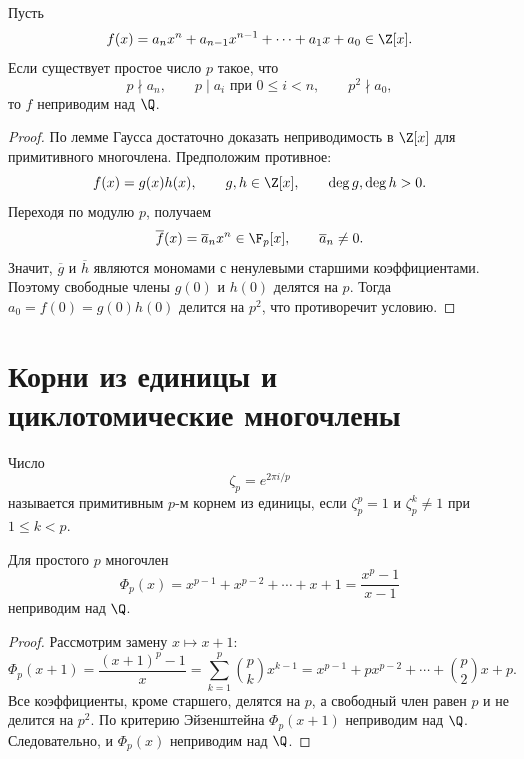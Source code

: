 \begin{stmt}
    Пусть
    \[
        f(x)=a_nx^n+a_{n-1}x^{n-1}+\cdots+a_1x+a_0 \in \Z[x].
    \]
    Если существует простое число $p$ такое, что
    \[
        p \nmid a_n, \qquad p\mid a_i \text{ при } 0\le i<n, \qquad p^2\nmid a_0,
    \]
    то $f$ неприводим над $\Q$.

    \begin{proof}
        По лемме Гаусса достаточно доказать неприводимость в $\Z[x]$ для примитивного многочлена. Предположим противное:
        \[
            f(x)=g(x)h(x), \qquad g,h\in \Z[x], \qquad \deg g,\deg h>0.
        \]
        Переходя по модулю $p$, получаем
        \[
            \overline f(x)=\overline a_n x^n \in \F_p[x], \qquad \overline a_n\neq0.
        \]
        Значит, $\overline g$ и $\overline h$ являются мономами с ненулевыми старшими коэффициентами.
        Поэтому свободные члены $g(0)$ и $h(0)$ делятся на $p$. Тогда $a_0=f(0)=g(0)h(0)$ делится на
        $p^2$, что противоречит условию.
    \end{proof}
\end{stmt}

\section{Корни из единицы и циклотомические многочлены}

\begin{definition}
    Число
    \[
        \zeta_p = e^{2\pi i/p}
    \]
    называется примитивным $p$-м корнем из единицы, если $\zeta_p^p=1$ и $\zeta_p^k\neq1$ при $1\le k<p$.
\end{definition}

\begin{stmt}
    Для простого $p$ многочлен
    \[
        \Phi_p(x)=x^{p-1}+x^{p-2}+\cdots+x+1=\frac{x^p-1}{x-1}
    \]
    неприводим над $\Q$.

    \begin{proof}
        Рассмотрим замену $x\mapsto x+1$:
        \[
            \Phi_p(x+1)=\frac{(x+1)^p-1}{x}
            = \sum_{k=1}^{p}\binom pk x^{k-1}
            = x^{p-1}+p x^{p-2}+\cdots+\binom p2x+p.
        \]
        Все коэффициенты, кроме старшего, делятся на $p$, а свободный член равен $p$ и не делится на
        $p^2$. По критерию Эйзенштейна $\Phi_p(x+1)$ неприводим над $\Q$. Следовательно, и $\Phi_p(x)$ неприводим над $\Q$.
    \end{proof}
\end{stmt}

